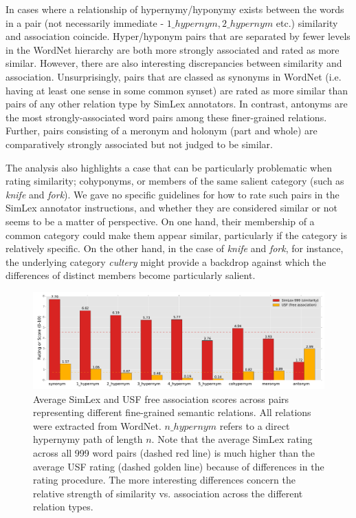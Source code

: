 In cases where a relationship of hypernymy/hyponymy exists between the words in a pair (not necessarily immediate - \(1\_hypernym, 2\_hypernym\) etc.) similarity and association coincide. Hyper/hyponym pairs that are separated by fewer levels in the WordNet hierarchy are both more strongly associated and rated as more similar. However, there are also interesting discrepancies between similarity and association. Unsurprisingly, pairs that are classed as synonyms in WordNet (i.e. having at least one sense in some common synset) are rated as more similar than pairs of any other relation type by SimLex annotators. In contrast, antonyms are the most strongly-associated word pairs among these finer-grained relations. Further, pairs consisting of a meronym and holonym (part and whole) are comparatively strongly associated but not judged to be similar. 

The analysis also highlights a case that can be particularly problematic when rating similarity;  cohyponyms, or members of the same salient category (such as \emph{knife} and \emph{fork}). We gave no specific guidelines for how to rate such pairs in the SimLex annotator instructions, and whether they are considered similar or not seems to be a matter of perspective. On one hand, their membership of a common category could make them appear similar, particularly if the category is relatively specific. On the other hand, in the case of \emph{knife} and \emph{fork}, for instance, the underlying category \emph{cultery} might provide a backdrop against which the differences of distinct members become particularly salient. 

\begin{figure}[ht]  \includegraphics[width =\textwidth]{Chapter_3/simlex_relations_CL}  \caption{Average SimLex and USF free association scores across pairs representing different fine-grained semantic relations. All relations were extracted from WordNet. \(n\_hypernym\) refers to a direct hypernymy path of length \(n\). Note that the average SimLex rating across all 999 word pairs (dashed red line) is much higher than the average USF rating (dashed golden line) because of differences in the rating procedure. The more interesting differences concern the relative strength of similarity vs. association across the different relation types.}\end{figure}  

